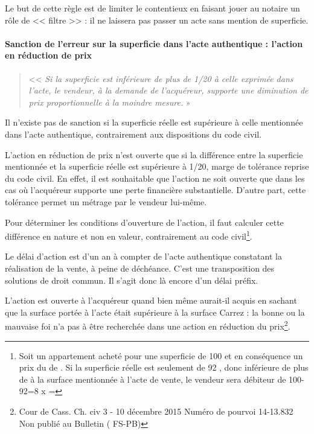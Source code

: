 				Le but de cette règle est de limiter le contentieux en faisant jouer au notaire un rôle de << filtre >> : il ne
				laissera pas passer un acte sans mention de superficie.
			
			\paragraph{Sanction de l'erreur sur la superficie dans l'acte authentique : l'action en	réduction de prix}
			
				\begin{quote}
					<< \emph{Si la superficie est inférieure de plus de 1/20\ieme{} à celle exprimée dans l'acte, le vendeur, à
					la demande de l'acquéreur, supporte une diminution de prix proportionnelle à la moindre	mesure.} »
				\end{quote}
				
				Il n'existe pas de sanction si la superficie réelle est supérieure à celle mentionnée dans l'acte authentique,
				contrairement aux dispositions du code civil.
				
				L'action en réduction de prix n'est ouverte que si la différence entre la superficie mentionnée et la
				superficie réelle est supérieure à 1/20\ieme, marge de tolérance reprise du code civil. En effet, il est souhaitable	que l'action ne soit ouverte que dans les cas où l'acquéreur supporte une perte financière substantielle. D'autre part, cette tolérance permet un métrage par le vendeur lui-même.
				
				Pour déterminer les conditions d'ouverture de l'action, il faut calculer cette différence en nature et non
				en valeur, contrairement au code civil\footnote{
					Soit un appartement acheté  pour une superficie de 100 \metreCarre{} et en conséquence un prix du \metreCarre{} de . Si la superficie
					réelle est seulement de 92 \metreCarre, donc inférieure de plus de  à la surface mentionnée à l’acte de vente, le vendeur sera débiteur de 100-
					92=8\metreCarre{} x  = 
				}.
				
				Le délai d'action est d'un an à compter de l'acte authentique constatant la réalisation de la vente, à peine
				de déchéance. C'est une transposition des solutions de droit commun. Il s'agit donc là encore d'un délai
				préfix.
				
				L’action est ouverte à l’acquéreur quand bien même aurait-il acquis en sachant que la surface portée à
				l’acte était supérieure à la surface Carrez : la bonne ou la mauvaise foi n’a pas à être recherchée dans une
				action en réduction du prix\footnote{Cour de Cass. Ch. civ 3 - 10 décembre 2015 Numéro de pourvoi 14-13.832 Non publié au Bulletin ( FS-PB)}.
				
